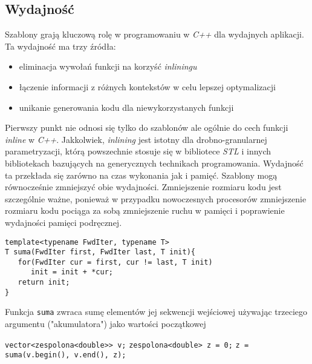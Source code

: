 \documentclass[11pt, a4paper]{article}
\begin{document}
\subsection{Wydajność}

Szablony grają kluczową rolę w programowaniu w \emph{C++} dla wydajnych aplikacji. Ta wydajność ma trzy źródła:

\begin{itemize}

\item eliminacja wywołań funkcji na korzyść \emph{inliningu}
\item łączenie informacji z różnych kontekstów w celu lepszej optymalizacji
\item unikanie generowania kodu dla niewykorzystanych funkcji

\end{itemize}

Pierwszy punkt nie odnosi się tylko do szablonów ale ogólnie do cech funkcji \emph{inline} w \emph{C++}. Jakkolwiek, \emph{inlining} jest istotny dla drobno-granularnej parametryzacji, którą powszechnie stosuje się w bibliotece \emph{STL} i innych bibliotekach  bazujących na generycznych technikach programowania. Wydajność ta przekłada się zarówno na czas wykonania jak i pamięć. Szablony mogą równocześnie zmniejszyć obie wydajności. Zmniejszenie rozmiaru kodu jest szczególnie ważne, ponieważ w przypadku nowoczesnych procesorów zmniejszenie rozmiaru kodu pociąga za sobą zmniejszenie ruchu w pamięci i poprawienie wydajności pamięci podręcznej.

\begin{lstlisting}[frame=single]
template<typename FwdIter, typename T>
T suma(FwdIter first, FwdIter last, T init){
   for(FwdIter cur = first, cur != last, T init)
      init = init + *cur;
   return init;
}

\end{lstlisting}

Funkcja \verb#suma# zwraca sumę elementów jej sekwencji wejściowej używając trzeciego argumentu ("akumulatora") jako wartości początkowej\newline

\noindent \verb#vector<zespolona<double>> v;#  \newline
\verb#zespolona<double> z = 0;# \newline
\verb#z = suma(v.begin(), v.end(), z);# \newline
\end{document}
